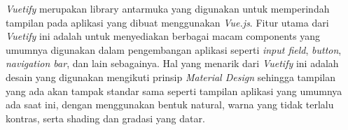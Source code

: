 \emph{Vuetify} merupakan library antarmuka yang digunakan untuk memperindah tampilan pada aplikasi yang dibuat menggunakan \emph{Vue.js}.
Fitur utama dari \emph{Vuetify} ini adalah untuk menyediakan berbagai macam components yang umumnya digunakan dalam pengembangan aplikasi seperti \emph{input field}, \emph{button}, \emph{navigation bar}, dan lain sebagainya.
Hal yang menarik dari \emph{Vuetify} ini adalah desain yang digunakan mengikuti prinsip \emph{Material Design} sehingga tampilan yang ada akan tampak standar sama seperti tampilan aplikasi yang umumnya ada saat ini, dengan menggunakan bentuk natural, warna yang tidak terlalu kontras, serta shading dan gradasi yang datar.
\vspace{0.5ex}